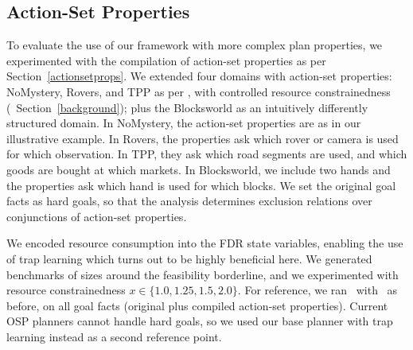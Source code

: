 
\subsection{Action-Set Properties}
\label{experiments:asp}


To evaluate the use of our framework with more complex plan
properties, we experimented with the compilation of action-set
properties as per Section~\ref{actionsetprops}.
%
We extended four domains with action-set properties: NoMystery,
Rovers, and TPP as per \cite{nakhost:etal:icaps-12}, with controlled
resource constrainedness (\cf\ Section~\ref{background}); plus the
Blocksworld as an intuitively differently structured domain.
%
In NoMystery, the action-set properties are as in our illustrative
example. In Rovers, the properties ask which rover or camera is used
for which observation. In TPP, they ask which road segments are used,
and which goods are bought at which markets. In Blocksworld, we
include two hands and the properties ask which hand is used for which
blocks.
%
We set the original goal facts as hard goals, so that the analysis
determines exclusion relations over conjunctions of action-set
properties.

We encoded resource consumption into the FDR state variables, enabling
the use of trap learning which turns out to be highly beneficial
here. We generated benchmarks of sizes around the feasibility
borderline, and we experimented with resource constrainedness
$x \in \{1.0, 1.25, 1.5, 2.0\}$. For reference, we ran \astar\
with \hlmcut\ as before, on all goal facts (original plus compiled
action-set properties). Current OSP planners cannot handle hard goals,
so we used our base planner with trap learning instead as a second
reference point.

